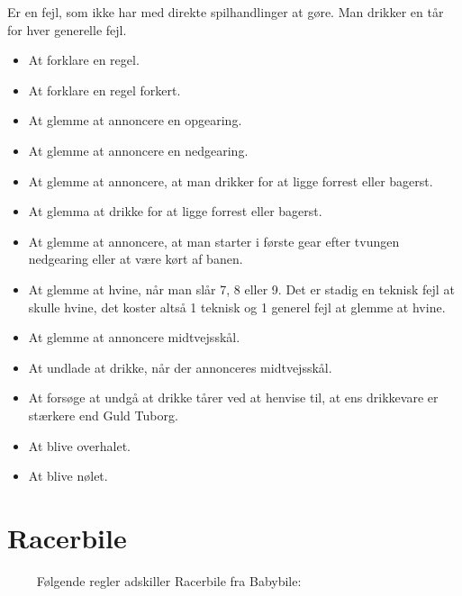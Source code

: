 \documentclass[12pt]{article}
\begin{document}
Er en fejl, som ikke har med direkte spilhandlinger at gøre. Man drikker en tår for hver generelle fejl.

\begin{itemize}
	\item At forklare en regel.
	\item At forklare en regel forkert.
	\item At glemme at annoncere en opgearing.
	\item At glemme at annoncere en nedgearing.
	\item At glemme at annoncere, at man drikker for at ligge forrest eller bagerst.
	\item At glemma at drikke for at ligge forrest eller bagerst.
	\item At glemme at annoncere, at man starter i første gear efter tvungen nedgearing eller at være kørt af banen.
	\item At glemme at hvine, når man slår 7, 8 eller 9. Det er stadig en teknisk fejl at skulle hvine, det koster altså 1 teknisk og 1 generel fejl at glemme at hvine.
	\item At glemme at annoncere midtvejsskål.
	\item At undlade at drikke, når der annonceres midtvejsskål.
	\item At forsøge at undgå at drikke tårer ved at henvise til, at ens drikkevare er stærkere end Guld Tuborg.
	\item At blive overhalet.
	\item At blive nølet.
\end{itemize}


\newpage


\section*{Racerbile}

$\qquad$ Følgende regler adskiller Racerbile fra Babybile:
\end{document}
